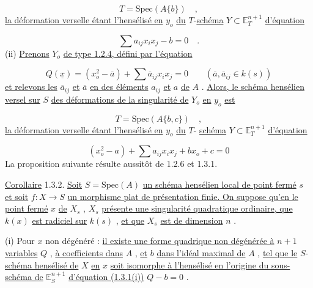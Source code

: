 \begin{equation*}
T = \mathrm{Spec}(A\{b\}) \quad ,
\end{equation*}
\underline{la déformation verselle étant l'hensélisé en} $y_o$ \underline{du} $T$-\underline{schéma} $Y \subset \mathbb{E}_T^{n+1}$ \underline{d'équation} 



\begin{equation*}
 \sum a_{ij} x_i x_j - b = 0 \quad .
\end{equation*}
(ii) \underline{Prenons} $Y_o$ \underline{de type 1.2.4, défini par l'équation}

\begin{equation*}
Q(\underline{x}) = (x_o^2 - \overline{a}) + \sum \overline{a}_{ij} x_i x_j = 0 \qquad (\overline{a},\overline{a}_{ij} \in k(s))
\end{equation*}
\underline{et relevons les} $\overline{a}_{ij}$ \underline{et} $\overline{a}$ \underline{en des éléments} $a_{ij}$ \underline{et} $a$ \underline{de} $A$ . \underline{Alors, le schéma hensélien versel sur} $S$ \underline{des déformations de la singularité de} $Y_o$ \underline{en} $y_o$ \underline{est}

\begin{equation*}
T = \mathrm{Spec}(A\{b,c\}) \quad ,
\end{equation*}
\underline{la déformation verselle étant l'hensélisé en} $y_o$ \underline{du} $T$- \underline{schéma} $Y \subset \mathbb{E}_T^{n+1}$ \underline{d'équation}

\begin{equation*}
(x_o^2 - a) + \sum a_{ij} x_i x_j + b x_o + c = 0
\end{equation*}
La proposition suivante résulte aussitôt de 1.2.6 et 1.3.1.

\underline{Corollaire} 1.3.2.  \underline{Soit} $S = \mathrm{Spec}(A)$ \underline{un schéma hensélien local de point fermé} $s$ \underline{et soit} $f : X \to S$ \underline{un morphisme plat de présentation finie. On suppose qu'en le point fermé} $x$ \underline{de} $X_s$ , $X_s$ \underline{présente une singularité quadratique ordinaire, que} $k(x)$ \underline{est radiciel sur} $k(s)$ , \underline{et que} $X_s$ \underline{est de dimension} $n$ .

(i) Pour $x$ non dégénéré : \underline{il existe une forme quadrique non dégénérée à} $n+1$ \underline{variables} $Q$ , \underline{à coefficients dans} $A$ , \underline{et} $b$ \underline{dans l'idéal maximal de} $A$ , \underline{tel que le} $S$-\underline{schéma hensélisé de} $X$ \underline{en} $x$ \underline{soit isomorphe à l'hensélisé en l'origine du sous-schéma de} $\mathbb{E}_S^{n+1}$ \underline{d'équation (1.3.1(i))} $Q - b = 0$ .

